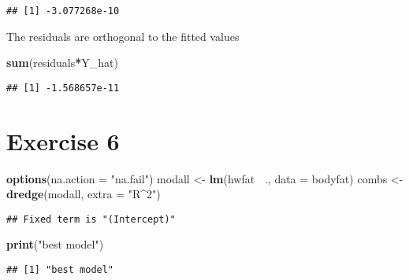 \documentclass[]{article}
\newenvironment{Shaded}{\begin{snugshade}}{\end{snugshade}}
\newcommand{\DataTypeTok}[1]{\textcolor[rgb]{0.13,0.29,0.53}{#1}}
\newcommand{\KeywordTok}[1]{\textcolor[rgb]{0.13,0.29,0.53}{\textbf{#1}}}
\newcommand{\NormalTok}[1]{#1}
\newcommand{\OperatorTok}[1]{\textcolor[rgb]{0.81,0.36,0.00}{\textbf{#1}}}
\newcommand{\StringTok}[1]{\textcolor[rgb]{0.31,0.60,0.02}{#1}}
\begin{document}
\begin{verbatim}
## [1] -3.077268e-10
\end{verbatim}

The residuals are orthogonal to the fitted values

\begin{Shaded}
\begin{Highlighting}[]
\KeywordTok{sum}\NormalTok{(residuals}\OperatorTok{*}\NormalTok{Y_hat)}
\end{Highlighting}
\end{Shaded}

\begin{verbatim}
## [1] -1.568657e-11
\end{verbatim}

\newpage

\hypertarget{exercise-6}{%
\section{Exercise 6}\label{exercise-6}}

\begin{Shaded}
\begin{Highlighting}[]
\KeywordTok{options}\NormalTok{(}\DataTypeTok{na.action =} \StringTok{"na.fail"}\NormalTok{)}
\NormalTok{modall <-}\StringTok{ }\KeywordTok{lm}\NormalTok{(hwfat }\OperatorTok{~}\NormalTok{., }\DataTypeTok{data =}\NormalTok{ bodyfat)}
\NormalTok{combs <-}\StringTok{ }\KeywordTok{dredge}\NormalTok{(modall, }\DataTypeTok{extra =} \StringTok{"R^2"}\NormalTok{)}
\end{Highlighting}
\end{Shaded}

\begin{verbatim}
## Fixed term is "(Intercept)"
\end{verbatim}

\begin{Shaded}
\begin{Highlighting}[]
\KeywordTok{print}\NormalTok{(}\StringTok{"best model"}\NormalTok{)}
\end{Highlighting}
\end{Shaded}

\begin{verbatim}
## [1] "best model"
\end{verbatim}

\begin{Shaded}
\end{Shaded}
\end{document}
